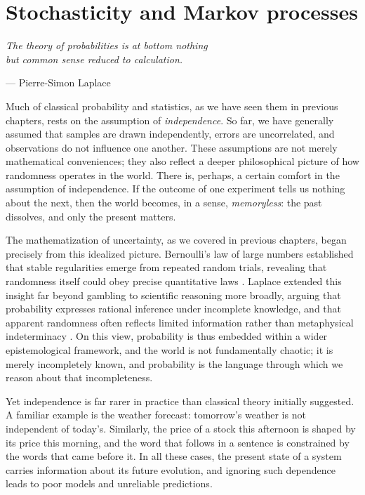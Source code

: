 \chapter{Stochasticity and Markov processes}
\label{chapter7}

\epigraph{\textit{The theory of probabilities is at bottom nothing\\but common sense reduced to calculation.}}{— Pierre-Simon Laplace}

Much of classical probability and statistics, as we have seen them in previous chapters, rests on the assumption of \textit{independence}. So far, we have generally assumed that samples are drawn independently, errors are uncorrelated, and observations do not influence one another. These assumptions are not merely mathematical conveniences; they also reflect a deeper philosophical picture of how randomness operates in the world. There is, perhaps, a certain comfort in the assumption of independence. If the outcome of one experiment tells us nothing about the next, then the world becomes, in a sense, \textit{memoryless}: the past dissolves, and only the present matters.

\medskip

The mathematization of uncertainty, as we covered in previous chapters, began precisely from this idealized picture. Bernoulli's law of large numbers established that stable regularities emerge from repeated random trials, revealing that randomness itself could obey precise quantitative laws \cite{bernoulli_1713_ars}. Laplace extended this insight far beyond gambling to scientific reasoning more broadly, arguing that probability expresses rational inference under incomplete knowledge, and that apparent randomness often reflects limited information rather than metaphysical indeterminacy \cite{laplace_1812_theorie}. On this view, probability is thus embedded within a wider epistemological framework, and the world is not fundamentally chaotic; it is merely incompletely known, and probability is the language through which we reason about that incompleteness.

\medskip

Yet independence is far rarer in practice than classical theory initially suggested. A familiar example is the weather forecast: tomorrow's weather is not independent of today's. Similarly, the price of a stock this afternoon is shaped by its price this morning, and the word that follows in a sentence is constrained by the words that came before it. In all these cases, the present state of a system carries information about its future evolution, and ignoring such dependence leads to poor models and unreliable predictions.

